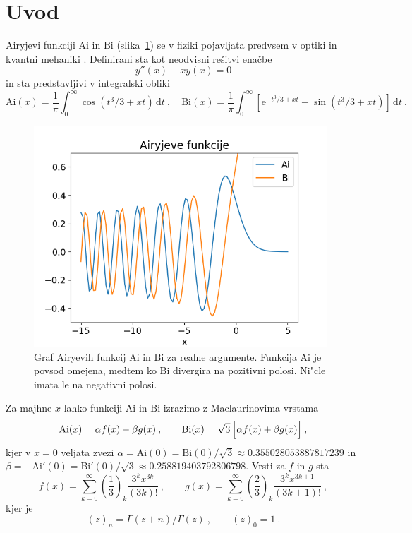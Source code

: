 \documentclass{article}
\newcommand{\Ai}{\mathrm{Ai}}
\newcommand{\Bi}{\mathrm{Bi}}
\newcommand{\dd}{\,\mathrm{d}}
\begin{document}
\section{Uvod}
Airyjevi funkciji $\Ai$ in $\Bi$ (slika~\ref{sl:airy})
se v fiziki pojavljata predvsem v optiki in kvantni mehaniki
\cite{1_vallee}.  Definirani sta kot neodvisni rešitvi enačbe
%
\begin{equation*}
  y''(x) -xy(x) = 0
\end{equation*}
%
in sta predstavljivi v integralski obliki
%
\begin{equation*}
  \Ai(x) = \frac{1}{\pi} \int_0^\infty \cos (t^3/3 + x t) \dd t \>,\quad
  \Bi(x) = \frac{1}{\pi} \int_0^\infty \left[ \mathrm{e}^{-t^3/3 + x t}
  + \sin (t^3/3 + x t) \right] \dd t \>.
\end{equation*}
%

\begin{figure}[hbtp]
\begin{center}
\includegraphics[width=11cm]{both_funcs.png}
\end{center}
\vspace*{-7mm}
\caption{Graf Airyevih funkcij $\Ai$ in $\Bi$ za realne
argumente.  Funkcija $\Ai$ je povsod omejena,
medtem ko $\Bi$ divergira na pozitivni polosi.
Ni"cle imata le na negativni polosi.}
\label{sl:airy}
\end{figure}

Za majhne $x$ lahko funkciji $\Ai$ in $\Bi$ izrazimo
z Maclaurinovima vrstama
%
\begin{equation*}
  \Ai(x) = \alpha f(x) - \beta g(x)\>,\qquad
  \Bi(x) = \sqrt{3}\, \Bigl[\alpha f (x) + \beta g(x) \Bigr]\>,
\end{equation*}
kjer v $x=0$ veljata zvezi
%
$\alpha = \Ai(0) = \Bi(0)/\sqrt{3}\approx 0.355028053887817239$ in
$\beta = -\Ai'(0) = \Bi'(0)/\sqrt{3}\approx 0.258819403792806798$.
Vrsti za $f$ in $g$ sta
\begin{equation*}
  f(x) = \sum_{k=0}^\infty
  \left(\frac{1}{3}\right)_k \frac{3^k x^{3k}}{(3k)!} \>, \qquad
  g(x) = \sum_{k=0}^\infty
  \left(\frac{2}{3}\right)_k \frac{3^k x^{3k+1}}{(3k+1)!} \>,
\end{equation*}
kjer je
\begin{equation*}
  (z)_n = \Gamma(z+n)/\Gamma(z) \>, \qquad (z)_0 = 1 \>.
\end{equation*}
\end{document}
